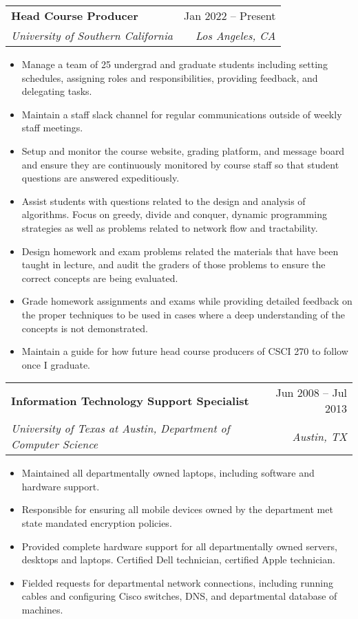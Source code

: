 \documentclass[letterpaper,11pt]{article}
\makeatletter
\newcommand{\resumeItem}[1]{
  \item\small{
    {#1 \vspace{-2pt}}
  }
}
\newcommand{\resumeSubheading}[4]{
  \vspace{-2pt}\item
    \begin{tabular*}{0.97\textwidth}[t]{l@{\extracolsep{\fill}}r}
      \textbf{#1} & #2 \\
      \textit{\small#3} & \textit{\small #4} \\
    \end{tabular*}\vspace{-7pt}
}
\newcommand{\resumeSubSubheading}[2]{
    \item
    \begin{tabular*}{0.97\textwidth}{l@{\extracolsep{\fill}}r}
      \textit{\small#1} & \textit{\small #2} \\
    \end{tabular*}\vspace{-7pt}
}
\newcommand{\resumeSubHeadingListEnd}{\end{itemize}}
\newcommand{\resumeItemListStart}{\begin{itemize}}
\newcommand{\resumeItemListEnd}{\end{itemize}\vspace{-5pt}}
\makeatother
\begin{document}
    \resumeSubheading
      {Head Course Producer}{Jan 2022 -- Present}
      {University of Southern California}{Los Angeles, CA}
      \resumeItemListStart
        \resumeItem{Manage a team of 25 undergrad and graduate students including setting schedules, assigning roles and responsibilities, providing feedback, and delegating tasks.}
        \resumeItem{Maintain a staff slack channel for regular communications outside of weekly staff meetings.}
        \resumeItem{Setup and monitor the course website, grading platform, and message board and ensure they are continuously monitored by course staff so that student questions are answered expeditiously.}
        \resumeItem{Assist students with questions related to the design and analysis of algorithms. Focus on greedy, divide and conquer, dynamic programming strategies as well as problems related to network flow and tractability.}
        \resumeItem{Design homework and exam problems related the materials that have been taught in lecture, and audit the graders of those problems to ensure the correct concepts are being evaluated.}
        \resumeItem{Grade homework assignments and exams while providing detailed feedback on the proper techniques to be used in cases where a deep understanding of the concepts is not demonstrated.}
        \resumeItem{Maintain a guide for how future head course producers of CSCI 270 to follow once I graduate.}

      \resumeItemListEnd
      

    \resumeSubheading
      {Information Technology Support Specialist}{Jun 2008 -- Jul 2013}
      {University of Texas at Austin, Department of Computer Science}{Austin, TX}
      \resumeItemListStart
        \resumeItem{Maintained all departmentally owned laptops, including software and hardware support.}
        \resumeItem{Responsible for ensuring all mobile devices owned by the department met state mandated encryption policies.}
        \resumeItem{Provided complete hardware support for all departmentally owned servers, desktops and laptops. Certified Dell technician, certified Apple technician.}
        \resumeItem{Fielded requests for departmental network connections, including running cables and configuring Cisco switches, DNS, and departmental database of machines.}
    \resumeItemListEnd
\end{document}
